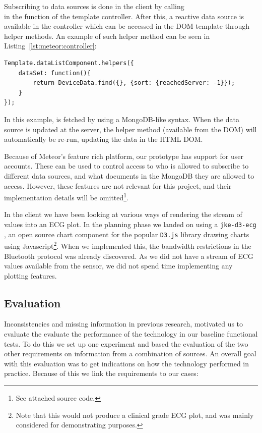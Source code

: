 Subscribing to data sources is done in the client by calling\\  in the  function of the template controller. After this, a reactive data source is available in the controller which can be accessed in the DOM-template through helper methods. An example of such helper method can be seen in Listing~\ref{lst:meteor:controller}:\\

\begin{lstlisting}[caption={Template helper exposing a reactive data source}, label={lst:meteor:controller}, basicstyle=\small]
Template.dataListComponent.helpers({
    dataSet: function(){
        return DeviceData.find({}, {sort: {reachedServer: -1}});
    }
});
\end{lstlisting}
In this example,  is fetched by using a MongoDB-like syntax. When the data source is updated at the server, the  helper method (available from the DOM) will automatically be re-run, updating the data in the HTML DOM.

Because of Meteor's feature rich platform, our prototype has support for user accounts. These can be used to control access to who is allowed to subscribe to different data sources, and what documents in the MongoDB they are allowed to access. However, these features are not relevant for this project, and their implementation details will be omitted\footnote{ See attached source code.}.

In the client we have been looking at various ways of rendering the stream of values into an ECG plot. In the planning phase we landed on using a \texttt{jke-d3-ecg} \cite{jke:d3}, an open source chart component for the popular \texttt{D3.js} library drawing charts using Javascript\footnote{ Note that this would not produce a clinical grade ECG plot, and was mainly considered for demonstrating purposes.}. When we implemented this, the bandwidth restrictions in the Bluetooth protocol was already discovered. As we did not have a stream of ECG values available from the sensor, we did not spend time implementing any plotting features. 


\subsection{Evaluation} %
\label{sub:evaluation}

Inconsistencies and missing information in previous research, motivated us to evaluate the evaluate the performance of the technology in our baseline functional tests. To do this we set up one experiment and based the evaluation of the two other requirements on information from a combination of sources. An overall goal with this evaluation was to get indications on how the technology performed in practice. Because of this we link the requirements to our cases:

